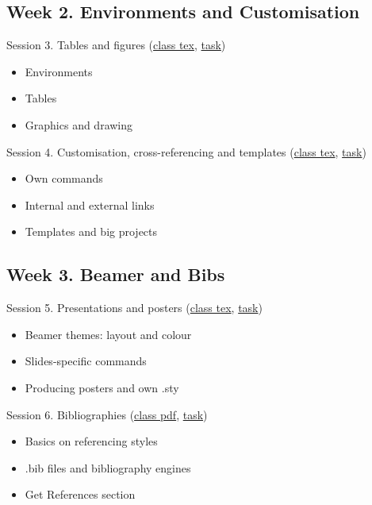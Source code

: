 \documentclass[a4paper,12pt]{article} %
\begin{document}
\subsection*{Week 2. Environments and Customisation}
	Session 3. Tables and figures (\href{https://github.com/kunilovskaya/dskills_workshop/blob/main/w2_latex_frills/session3.tex}{class tex}, \href{https://github.com/kunilovskaya/dskills_workshop/blob/main/w2_latex_frills/task3.tex}{task})
			\begin{itemize}
				\item Environments
				\item Tables
				\item Graphics and drawing
			\end{itemize}
	Session 4. Customisation, cross-referencing and templates (\href{https://github.com/kunilovskaya/dskills_workshop/blob/main/w2_latex_frills/session4.tex}{class tex}, \href{https://github.com/kunilovskaya/dskills_workshop/blob/main/w2_latex_frills/task4.tex}{task})
			\begin{itemize}
				\item Own commands
				\item Internal and external links
				\item Templates and big projects
			\end{itemize}

\subsection*{Week 3. Beamer and Bibs}
	Session 5. Presentations and posters (\href{https://github.com/kunilovskaya/dskills_workshop/blob/main/w3_bibs_beamer/session5.tex}{class tex}, \href{https://github.com/kunilovskaya/dskills_workshop/blob/main/w3_bibs_beamer/task5.tex}{task})
	\begin{itemize}
		\item Beamer themes: layout and colour
		\item Slides-specific commands
		\item Producing posters and own .sty 
	\end{itemize}

\newpage

	Session 6. Bibliographies (\href{https://canvas.wlv.ac.uk/courses/33429/files/folder/LaTeX\%20and\%20Mendeley\%20workshop/w1-3_latex?preview=4648015}{class pdf}, \href{https://github.com/kunilovskaya/dskills_workshop/blob/main/w3_bibs_beamer/task6.tex}{task})
	\begin{itemize}
		\item Basics on referencing styles
		\item .bib files and bibliography engines
		\item Get References section
	\end{itemize}	
\end{document}
